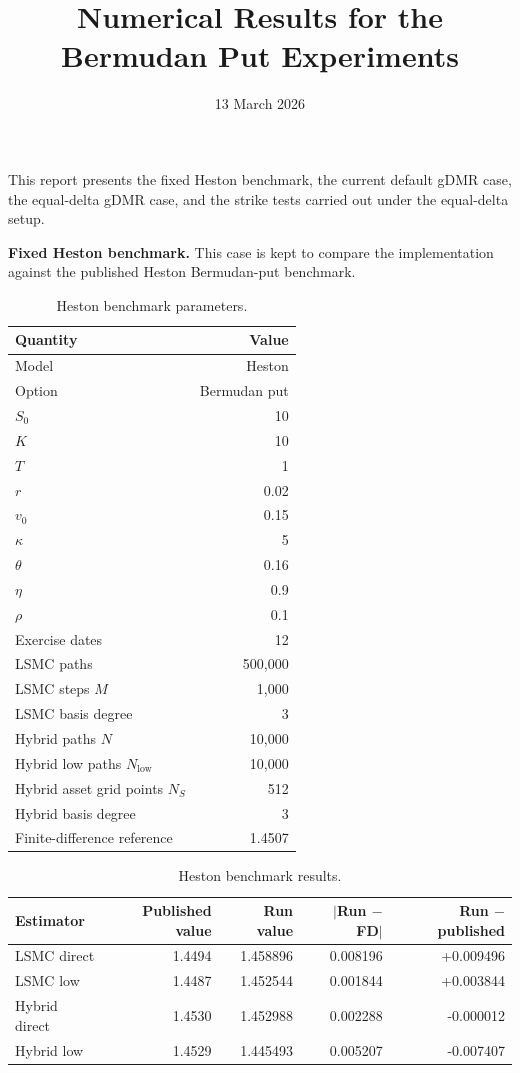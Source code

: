 \documentclass[11pt]{article}
\title{Numerical Results for the Bermudan Put Experiments}
\author{}
\date{13 March 2026}
\begin{document}
\maketitle

This report presents the fixed Heston benchmark, the current default gDMR case, the equal-delta
gDMR case, and the strike tests carried out under the equal-delta setup.

\textbf{Fixed Heston benchmark.} This case is kept to compare the implementation against the
published Heston Bermudan-put benchmark.

\begin{table}[H]
\centering
\caption{Heston benchmark parameters.}
\begin{tabular}{lr}
\toprule
Quantity & Value \\
\midrule
Model & Heston \\
Option & Bermudan put \\
$S_0$ & 10 \\
$K$ & 10 \\
$T$ & 1 \\
$r$ & 0.02 \\
$v_0$ & 0.15 \\
$\kappa$ & 5 \\
$\theta$ & 0.16 \\
$\eta$ & 0.9 \\
$\rho$ & 0.1 \\
Exercise dates & 12 \\
LSMC paths & 500,000 \\
LSMC steps $M$ & 1,000 \\
LSMC basis degree & 3 \\
Hybrid paths $N$ & 10,000 \\
Hybrid low paths $N_{\mathrm{low}}$ & 10,000 \\
Hybrid asset grid points $N_S$ & 512 \\
Hybrid basis degree & 3 \\
Finite-difference reference & 1.4507 \\
\bottomrule
\end{tabular}
\end{table}

\begin{table}[H]
\centering
\caption{Heston benchmark results.}
\begin{tabular}{lrrrr}
\toprule
Estimator & Published value & Run value & $|$Run $-$ FD$|$ & Run $-$ published \\
\midrule
LSMC direct   & 1.4494 & 1.458896 & 0.008196 & +0.009496 \\
LSMC low      & 1.4487 & 1.452544 & 0.001844 & +0.003844 \\
Hybrid direct & 1.4530 & 1.452988 & 0.002288 & -0.000012 \\
Hybrid low    & 1.4529 & 1.445493 & 0.005207 & -0.007407 \\
\bottomrule
\end{tabular}
\end{table}
\end{document}
